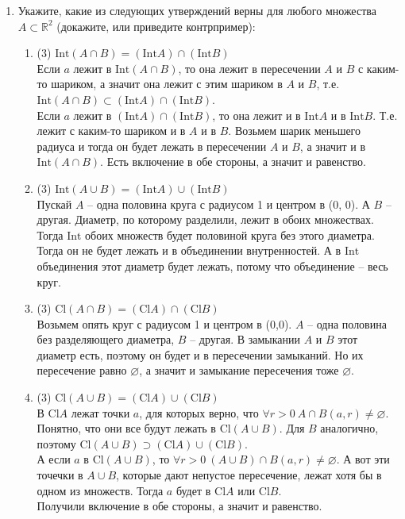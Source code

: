 \documentclass[a4paper]{article}
\def\Int{\mathrm{Int}}
\def\Cl{\mathrm{Cl}}
\begin{document}
\begin{enumerate}
    \item Укажите, какие из следующих утверждений верны для любого множества $A\subset \mathbb R^2$ (докажите, или приведите контрпример):

    \begin{enumerate}
        \item (3) $\Int (A\cap B) = (\Int A)\cap(\Int B)$\\
        Если $a$ лежит в $\Int (A\cap B)$, то она лежит в пересечении $A$ и $B$ с каким-то шариком, а значит она лежит с этим шариком в $A$ и $B$, т.е. $\Int (A\cap B)\subset (\Int A)\cap (\Int B)$.\\
        Если $a$ лежит в $(\Int A)\cap(\Int B)$, то она лежит и в $\Int A$ и в $\Int B$. Т.е. лежит с каким-то шариком и в $A$ и в $B$. Возьмем шарик меньшего радиуса и тогда он будет лежать в пересечении $A$ и $B$, а значит и в $\Int(A\cap B)$.
        Есть включение в обе стороны, а значит и равенство.
        \item (3) $\Int (A\cup B) = (\Int A)\cup(\Int B)$\\
        Пускай $A$ -- одна половина круга с радиусом 1 и центром в (0, 0). А $B$ -- другая. Диаметр, по которому разделили, лежит в обоих множествах. Тогда $\Int$ обоих множеств будет половиной круга без этого диаметра. Тогда он не будет лежать и в объединении внутренностей. А в $\Int$ объединения этот диаметр будет лежать, потому что объединение -- весь круг.
        \item (3) $\Cl (A\cap B) = (\Cl A)\cap(\Cl B)$\\
        Возьмем опять круг с радиусом 1 и центром в (0,0). $A$ -- одна половина без разделяющего диаметра, $B$ -- другая. В замыкании $A$ и $B$ этот диаметр есть, поэтому он будет и в пересечении замыканий. Но их пересечение равно $\varnothing$, а значит и замыкание пересечения тоже $\varnothing$.
        \item (3) $\Cl (A\cup B) = (\Cl A)\cup(\Cl B)$\\
        В $\Cl A$ лежат точки $a$, для которых верно, что $\forall r > 0\ A\cap B(a, r) \neq \varnothing$. Понятно, что они все будут лежать в $\Cl (A\cup B)$. Для $B$ аналогично, поэтому $\Cl (A\cup B) \supset (\Cl A)\cup(\Cl B)$.\\
        А если $a$ в $\Cl(A\cup B)$, то $\forall r > 0\ (A\cup B)\cap B(a, r) \neq \varnothing$. А вот эти точечки в $A\cup B$, которые дают непустое пересечение, лежат хотя бы в одном из множеств. Тогда $a$ будет в $\Cl A$ или $\Cl B$.\\
        Получили включение в обе стороны, а значит и равенство.

\end{enumerate}
\end{enumerate}
\end{document}
